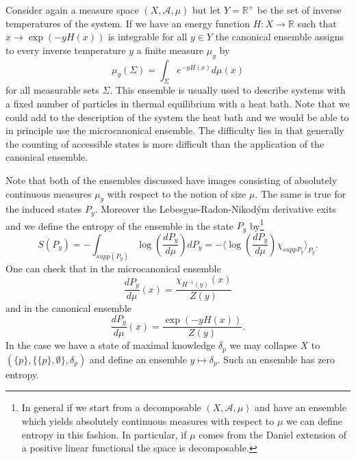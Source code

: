 \begin{example}
Consider again a measure space $(X,\mathcal{A},\mu)$ but let $Y=\mathbb{R}^+$ be the set of inverse temperatures of the system. If we have an energy function $H:X\rightarrow \mathbb{R}$ such that $x\rightarrow \exp(-y H(x))$ is integrable for all $y \in Y$ the canonical ensemble assigns to every inverse temperature $y$ a finite measure $\mu_y$ by
\begin{equation}
\mu_y(\Sigma)=\int_\Sigma e^{-y H(x)}d\mu(x)
\end{equation}
for all measurable sets $\Sigma$. This ensemble is usually used to describe systems with a fixed number of particles in thermal equilibrium with a heat bath. Note that we could add to the description of the system the heat bath and we would be able to in principle use the microcanonical ensemble. The difficulty lies in that generally the counting of accessible states is more difficult than the application of the canonical ensemble.
\end{example}

Note that both of the ensembles discussed have images consisting of absolutely continuous measures $\mu_y$ with respect to the notion of size $\mu$. The same is true for the induced states $P_y$. Moreover the Lebesgue-Radon-Nikodým derivative exits and we define the entropy of the ensemble in the state $P_y$ by\footnote{In general if we start from a decomposable $(X,\mathcal{A},\mu)$ and have an ensemble which yields absolutely continuous measures with respect to $\mu$ we can define entropy in this fashion. In particular, if $\mu$ comes from the Daniel extension of a positive linear functional the space is decomposable.}
\begin{equation}
S(P_y)=-\int_{supp(P_y)} \log\left(\frac{dP_y}{d\mu}\right)dP_y=-\langle\log\left(\frac{dP_y}{d\mu}\right)\chi_{supp P_y}\rangle_{P_y}.
\end{equation}
One can check that in the microcanonical ensemble 
\begin{equation}
\frac{dP_y}{d\mu}(x)=\frac{\chi_{H^{-1}(y)}(x)}{Z(y)}
\end{equation}
and in the canonical ensemble 
\begin{equation}
\frac{dP_y}{d\mu}(x)=\frac{\exp(-yH(x))}{Z(y)}. 
\end{equation}
In the case we have a state of maximal knowledge $\delta_p$ we may collapse $X$ to $(\{p\},\{\{p\},\emptyset\},\delta_p)$ and define an ensemble $y\mapsto \delta_p$. Such an ensemble has zero entropy.

